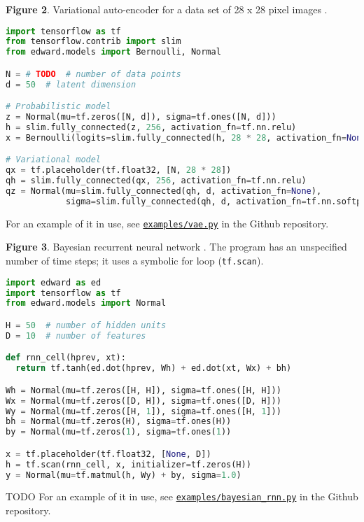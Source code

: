 \textbf{Figure 2}. Variational auto-encoder for a data set of 28 x 28 pixel images
\citep{kingma2014auto,rezende2014stochastic}.
\begin{lstlisting}[language=python]
import tensorflow as tf
from tensorflow.contrib import slim
from edward.models import Bernoulli, Normal

N = # TODO  # number of data points
d = 50  # latent dimension

# Probabilistic model
z = Normal(mu=tf.zeros([N, d]), sigma=tf.ones([N, d]))
h = slim.fully_connected(z, 256, activation_fn=tf.nn.relu)
x = Bernoulli(logits=slim.fully_connected(h, 28 * 28, activation_fn=None))

# Variational model
qx = tf.placeholder(tf.float32, [N, 28 * 28])
qh = slim.fully_connected(qx, 256, activation_fn=tf.nn.relu)
qz = Normal(mu=slim.fully_connected(qh, d, activation_fn=None),
            sigma=slim.fully_connected(qh, d, activation_fn=tf.nn.softplus))
\end{lstlisting}
For an example of it in use, see
\href{https://github.com/blei-lab/edward/blob/master/examples/vae.py}{\texttt{examples/vae.py}}
in the Github repository.

\textbf{Figure 3}. Bayesian recurrent neural network \citep{neal2012bayesian}.
The program has an unspecified number of time steps; it uses a
symbolic for loop (\texttt{tf.scan}).
\begin{lstlisting}[language=python]
import edward as ed
import tensorflow as tf
from edward.models import Normal

H = 50  # number of hidden units
D = 10  # number of features

def rnn_cell(hprev, xt):
  return tf.tanh(ed.dot(hprev, Wh) + ed.dot(xt, Wx) + bh)

Wh = Normal(mu=tf.zeros([H, H]), sigma=tf.ones([H, H]))
Wx = Normal(mu=tf.zeros([D, H]), sigma=tf.ones([D, H]))
Wy = Normal(mu=tf.zeros([H, 1]), sigma=tf.ones([H, 1]))
bh = Normal(mu=tf.zeros(H), sigma=tf.ones(H))
by = Normal(mu=tf.zeros(1), sigma=tf.ones(1))

x = tf.placeholder(tf.float32, [None, D])
h = tf.scan(rnn_cell, x, initializer=tf.zeros(H))
y = Normal(mu=tf.matmul(h, Wy) + by, sigma=1.0)
\end{lstlisting}
TODO
For an example of it in use, see
\href{https://github.com/blei-lab/edward/blob/master/examples/bayesian_rnn.py}{\texttt{examples/bayesian_rnn.py}}
in the Github repository.

